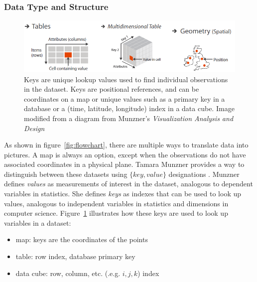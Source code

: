 \documentclass[../main.tex]{subfiles}
\begin{document}
\subsubsection{Data Type and Structure}
\label{sec:intro_data_structure}
\begin{figure}[h!]
 \includegraphics[width=\textwidth]{figures/intro/munzner_datatypes}
\caption{Keys are unique lookup values used to find individual observations in the dataset. Keys are positional references, and can be coordinates on a map or unique values such as a primary key in a database or a (time, latitude, longitude) index in a data cube. Image modified from a diagram from Munzner's \textit{Visualization Analysis and Design} \cite{munznerVisualizationAnalysisDesign2014}}
\label{fig:munzner_datatypes}
\end{figure}

As shown in figure~\ref{fig:flowchart}, there are multiple ways to translate data into pictures. A map is always an option, except when the observations do not have associated coordinates in a physical plane. Tamara Munzner provides a way to distinguish between these datasets using $\{key, value\}$ designations \cite{munznerVisualizationAnalysisDesign2014}. Munzner defines \textit{values} as measurements of interest in the dataset, analogous to dependent variables in statistics. She defines \textit{keys} as indexes that can be used to look up values, analogous to independent variables in statistics and dimensions in computer science. Figure~\ref{fig:munzner_datatypes} illustrates how these keys are used to look up variables in a dataset: 
\begin{itemize}
	\item map: keys are the coordinates of the points
	\item table: row index, database primary key
	\item data cube: row, column, etc. (.e.g. $i,j,k$) index
\end{itemize}
\end{document}
